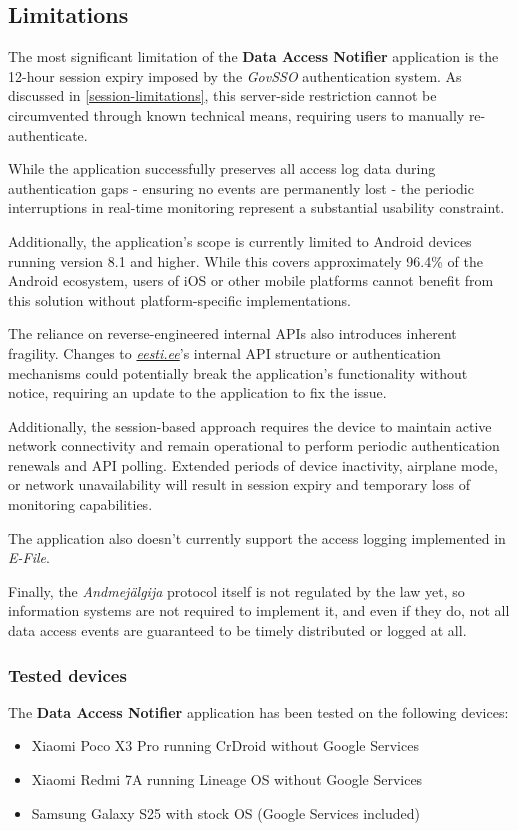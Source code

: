 \subsection{Limitations}
The most significant limitation of the \textbf{Data Access Notifier} application is the 12-hour session expiry imposed by the \textit{GovSSO} authentication system. As discussed in \ref{session-limitations}, this server-side restriction cannot be circumvented through known technical means, requiring users to manually re-authenticate.

While the application successfully preserves all access log data during authentication gaps - ensuring no events are permanently lost - the periodic interruptions in real-time monitoring represent a substantial usability constraint.

Additionally, the application's scope is currently limited to Android devices running version 8.1 and higher. While this covers approximately 96.4\% of the Android ecosystem, users of iOS or other mobile platforms cannot benefit from this solution without platform-specific implementations.

The reliance on reverse-engineered internal APIs also introduces inherent fragility. Changes to \textit{\href{https://www.eesti.ee}{eesti.ee}}'s internal API structure or authentication mechanisms could potentially break the application's functionality without notice, requiring an update to the application to fix the issue.

Additionally, the session-based approach requires the device to maintain active network connectivity and remain operational to perform periodic authentication renewals and API polling. Extended periods of device inactivity, airplane mode, or network unavailability will result in session expiry and temporary loss of monitoring capabilities.

The application also doesn't currently support the access logging implemented in \textit{E-File}.

Finally, the \textit{Andmejälgija} protocol itself is not regulated by the law yet, so information systems are not required to implement it, and even if they do, not all data access events are guaranteed to be timely distributed or logged at all.

\subsubsection{Tested devices}
The \textbf{Data Access Notifier} application has been tested on the following devices:
\begin{itemize}
    \item Xiaomi Poco X3 Pro running CrDroid without Google Services 
    \item Xiaomi Redmi 7A running Lineage OS without Google Services
    \item Samsung Galaxy S25 with stock OS (Google Services included)
\end{itemize}

